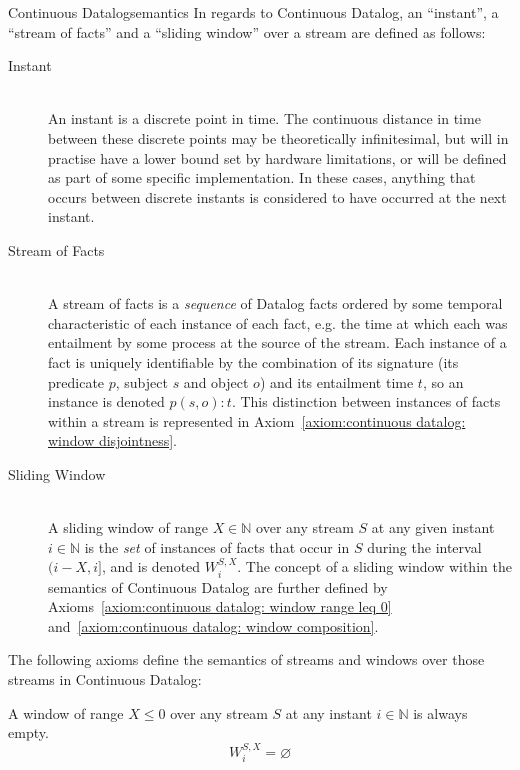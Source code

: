 \begin{nestedsection}{Continuous Datalog}{semantics}
	In regards to Continuous Datalog, an ``instant'', a ``stream of facts'' and a ``sliding window'' over a stream are defined as follows:
	\begin{description}
		\item[Instant\label{def:continuous datalog: instant}]\hfill\\
			An instant is a discrete point in time.
			The continuous distance in time between these discrete points may be theoretically infinitesimal, but will in practise have a lower bound set by hardware limitations, or will be defined as part of some specific implementation.
			In these cases, anything that occurs between discrete instants is considered to have occurred at the next instant.
		\item[Stream of Facts\label{def:continuous datalog: stream}]\hfill\\
			A stream of facts is a \emph{sequence} of Datalog facts ordered by some temporal characteristic of each instance of each fact, e.g. the time at which each was entailment by some process at the source of the stream.
			Each instance of a fact is uniquely identifiable by the combination of its signature (its predicate $p$, subject $s$ and object $o$) and its entailment time $t$, so an instance is denoted ${p(s,o):t}$.
			This distinction between instances of facts within a stream is represented in Axiom~\ref{axiom:continuous datalog: window disjointness}.
		\item[Sliding Window\label{def:continuous datalog: window}]\hfill\\
			A sliding window of range ${X \in \mathbb{N}}$ over any stream $S$ at any given instant ${i \in \mathbb{N}}$ is the \emph{set} of instances of facts that occur in $S$ during the interval ${(i-X,i]}$, and is denoted ${W^{S,X}_{i}}$.
			The concept of a sliding window within the semantics of Continuous Datalog are further defined by Axioms~\ref{axiom:continuous datalog: window range leq 0} and~\ref{axiom:continuous datalog: window composition}.
	\end{description}

	The following axioms define the semantics of streams and windows over
	those streams in Continuous Datalog:

	\begin{axiom}\label{axiom:continuous datalog: window range leq 0}
		A window of range ${X \leq 0}$ over any stream $S$ at any instant ${i \in \mathbb{N}}$ is always empty.
		\begin{equation*}
			W^{S,X}_{i} = \varnothing
		\end{equation*}
	\end{axiom}


\end{nestedsection}
